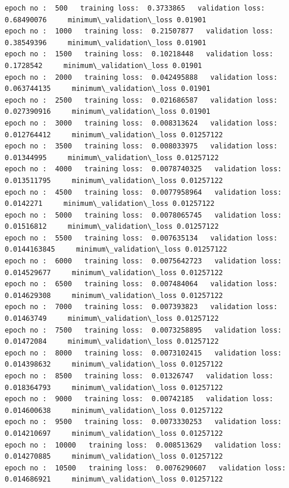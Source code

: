 \documentclass[11pt, a4paper , landscape]{article}
\begin{document}
    \begin{Verbatim}[commandchars=\\\{\}]
epoch no :  500   training loss:  0.3733865   validation loss:  0.68490076     minimum\_validation\_loss 0.01901
epoch no :  1000   training loss:  0.21507877   validation loss:  0.38549396     minimum\_validation\_loss 0.01901
epoch no :  1500   training loss:  0.10218448   validation loss:  0.1728542     minimum\_validation\_loss 0.01901
epoch no :  2000   training loss:  0.042495888   validation loss:  0.063744135     minimum\_validation\_loss 0.01901
epoch no :  2500   training loss:  0.021686587   validation loss:  0.027390916     minimum\_validation\_loss 0.01901
epoch no :  3000   training loss:  0.008313624   validation loss:  0.012764412     minimum\_validation\_loss 0.01257122
epoch no :  3500   training loss:  0.008033975   validation loss:  0.01344995     minimum\_validation\_loss 0.01257122
epoch no :  4000   training loss:  0.0078740325   validation loss:  0.013511795     minimum\_validation\_loss 0.01257122
epoch no :  4500   training loss:  0.0077958964   validation loss:  0.0142271     minimum\_validation\_loss 0.01257122
epoch no :  5000   training loss:  0.0078065745   validation loss:  0.01516812     minimum\_validation\_loss 0.01257122
epoch no :  5500   training loss:  0.007635134   validation loss:  0.0144163845     minimum\_validation\_loss 0.01257122
epoch no :  6000   training loss:  0.0075642723   validation loss:  0.014529677     minimum\_validation\_loss 0.01257122
epoch no :  6500   training loss:  0.007484064   validation loss:  0.014629308     minimum\_validation\_loss 0.01257122
epoch no :  7000   training loss:  0.007393823   validation loss:  0.01463749     minimum\_validation\_loss 0.01257122
epoch no :  7500   training loss:  0.0073258895   validation loss:  0.01472084     minimum\_validation\_loss 0.01257122
epoch no :  8000   training loss:  0.0073102415   validation loss:  0.014398632     minimum\_validation\_loss 0.01257122
epoch no :  8500   training loss:  0.01326747   validation loss:  0.018364793     minimum\_validation\_loss 0.01257122
epoch no :  9000   training loss:  0.00742185   validation loss:  0.014600638     minimum\_validation\_loss 0.01257122
epoch no :  9500   training loss:  0.0073330253   validation loss:  0.014210697     minimum\_validation\_loss 0.01257122
epoch no :  10000   training loss:  0.008513629   validation loss:  0.014270885     minimum\_validation\_loss 0.01257122
epoch no :  10500   training loss:  0.0076290607   validation loss:  0.014686921     minimum\_validation\_loss 0.01257122

\end{Verbatim}
\end{document}
